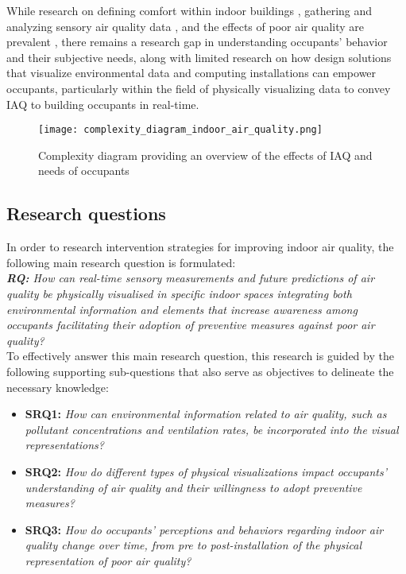While research on defining comfort within indoor buildings \cite{alavi_comfort_2017}, gathering and analyzing sensory air quality data \cite{corlan_importance_2021}, and the effects of poor air quality are prevalent \cite{klepeis_national_2001}, there remains a research gap in understanding occupants' behavior and their subjective needs, along with limited research on how design solutions that visualize environmental data and computing installations can empower occupants, particularly within the field of physically visualizing data to convey IAQ to building occupants in real-time. 

\begin{figure}[h]
    \centering
    \texttt{[image: complexity\_diagram\_indoor\_air\_quality.png]}
    \caption{Complexity diagram providing an overview of the effects of IAQ and needs of occupants \cite{schweizer_indoor_2007, wang_how_2021, kim_analyzing_2019, alavi_comfort_2017, corlan_importance_2021, klepeis_national_2001}}
    \label{fig:complexity}
\end{figure}



\subsection{Research questions}

In order to research intervention strategies for improving indoor air quality, the following main research question is formulated: \\

\emph{\textbf{RQ:} How can real-time sensory measurements and future predictions of air quality be physically visualised in specific indoor spaces integrating both environmental information and elements that increase awareness among occupants facilitating their adoption of preventive measures against poor air quality?} \\

To effectively answer this main research question, this research is guided by the following supporting sub-questions that also serve as objectives to delineate the necessary knowledge: \\

\begin{itemize}
    \item \textbf{SRQ1:} \emph{How can environmental information related to air quality, such as pollutant concentrations and ventilation rates, be incorporated into the visual representations?}
    \item \textbf{SRQ2:} \emph{How do different types of physical visualizations impact occupants' understanding of air quality and their willingness to adopt preventive measures?}
    \item \textbf{SRQ3:} \emph{How do occupants' perceptions and behaviors regarding indoor air quality change over time, from pre to post-installation of the physical representation of poor air quality?}\\
\end{itemize}